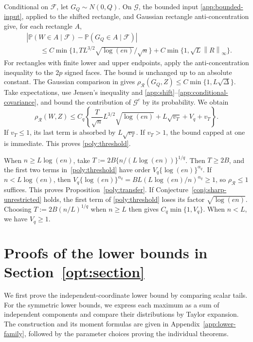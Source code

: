 \documentclass[11pt,letterpaper]{article}
\theoremstyle{remark}
\newcommand{\Pp}{\mathbb P}
\newcommand{\norm}[1]{\left\lVert#1\right\rVert}
\newcommand{\rh}{\rho_{\mathcal R}}
\begin{document}
Conditional on \(\mathcal F\), let \(G_Q\sim N(0,Q)\). On
\(\mathcal G\), the bounded input \eqref{app:bounded-input}, applied
to the shifted rectangle, and Gaussian rectangle anti-concentration
give, for each rectangle \(A\),
\begin{align*}
 &|\Pp(W\in A\mid\mathcal F)-\Pp(G_Q\in A\mid\mathcal F)|\\
 &\hspace{2em}\le
 C\min\{1,TL^{3/2}\sqrt{\log(en)}/\sqrt n\}
       +C\min\{1,\sqrt L\norm R_\infty\}.
\end{align*}
For rectangles with finite lower and upper endpoints, apply the
anti-concentration inequality to the \(2p\) signed faces. The bound
is unchanged up to an absolute constant. The Gaussian comparison in
\cite[Proposition~2.1]{CCKK2022} gives
\(\rh(G_Q,Z)\le C\min\{1,L\sqrt\Delta\}\).
Take expectations, use Jensen's inequality and
\eqref{app:shift}--\eqref{app:conditional-covariance}, and bound the
contribution of \(\mathcal G^c\) by its probability. We obtain
\[
 \rh(W,Z)\le C_q\left\{
 \frac{T}{\sqrt n}L^{3/2}\sqrt{\log(en)}
 +L\sqrt{v_T}+V_q+v_T\right\}.
\]
If \(v_T\le1\), its last term is absorbed by \(L\sqrt{v_T}\).
If \(v_T>1\), the bound capped at one is immediate. This proves
\eqref{poly:threshold}.

When \(n\ge L\log(en)\), take \(T:=2B\{n/(L\log(en))\}^{1/q}\).
Then \(T\ge2B\), and the first two terms in~\eqref{poly:threshold}
have order \(V_q\{\log(en)\}^{\alpha_q}\). If \(n<L\log(en)\), then
\(V_q\{\log(en)\}^{\alpha_q}=BL(L\log(en)/n)^{\alpha_q}\ge1\), so \(\rh\le1\)
suffices. This proves Proposition~\ref{poly:transfer}. If
Conjecture~\ref{conj:sharp-unrestricted} holds, the first term of
\eqref{poly:threshold} loses its factor \(\sqrt{\log(en)}\).
Choosing \(T:=2B(n/L)^{1/q}\) when \(n\ge L\) then gives
\(C_q\min\{1,V_q\}\). When \(n<L\), we have \(V_q\ge1\).

\section{Proofs of the lower bounds in Section~\ref*{opt:section}}\label{app:sharpness-proofs}

We first prove the independent-coordinate lower bound by comparing
scalar tails. For the symmetric lower bounds, we express each maximum
as a sum of independent components and compare their distributions
by Taylor expansion. The construction and its moment formulas are
given in Appendix~\ref{app:lower-family}, followed by the parameter
choices proving the individual theorems.
\end{document}
